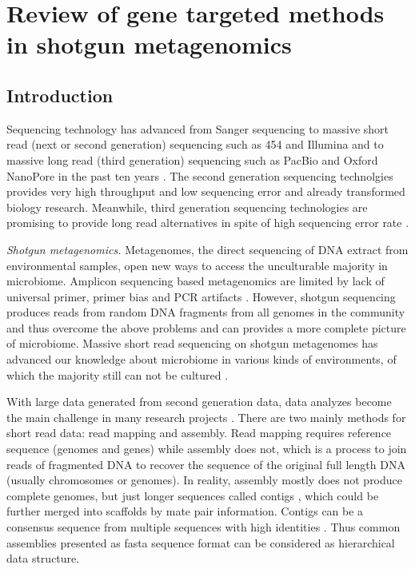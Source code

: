 \documentclass[]{msu-thesis}
\begin{document}
\chapter{Review of gene targeted methods in shotgun metagenomics}

\section{Introduction}

Sequencing technology has advanced from Sanger sequencing to massive short read (next or second generation) sequencing such as 454 and Illumina and to massive long read (third generation) sequencing such as PacBio and Oxford NanoPore in the past ten years \cite{mardis_impact_2008,pettersson_generations_2009}. The second generation sequencing technolgies provides very high throughput and low sequencing error and already transformed biology research. Meanwhile, third generation sequencing technologies are promising to provide long read alternatives in spite of high sequencing error rate \cite{rhoads_pacbio_2015}. 

\textit{Shotgun metagenomics. }
Metagenomes, the direct sequencing of DNA extract from environmental samples, open new ways to access the unculturable majority in microbiome. Amplicon sequencing based metagenomics are limited by lack of universal primer, primer bias and PCR artifacts \cite{frank_critical_2008,haas_chimeric_2011,guo_microbial_2015}. However, shotgun sequencing produces reads from random DNA fragments from all genomes in the community and thus overcome the above problems and can provides a more complete picture of microbiome. Massive short read sequencing on shotgun metagenomes has advanced our knowledge about microbiome in various kinds of environments, of which the majority still can not be cultured \cite{howe_tackling_2014,sunagawa_ocean_2015}.

With large data generated from second generation data, data analyzes become the main challenge in many research projects \cite{qin_human_2010,pell_scaling_2012}. There are two mainly methods for short read data: read mapping and assembly. Read mapping requires reference sequence (genomes and genes) while assembly does not, which is a process to join reads of fragmented DNA to recover the sequence of the original full length DNA (usually chromosomes or genomes). In reality, assembly mostly does not produce complete genomes, but just longer sequences called contigs \cite{qin_human_2010,howe_tackling_2014}, which could be further merged into scaffolds by mate pair information. Contigs can be a consensus sequence from multiple sequences with high identities \cite{zerbino_velvet:_2008}. Thus common assemblies presented as fasta sequence format can be considered as hierarchical data structure.
\end{document}
